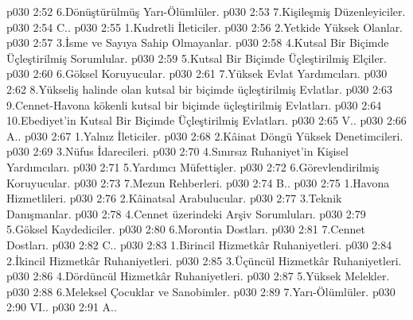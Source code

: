\vs p030 2:52 6.\bibnobreakspace Dönüştürülmüş Yarı\hyp{}Ölümlüler.
\vs p030 2:53 7.\bibnobreakspace Kişileşmiş Düzenleyiciler.
\vs p030 2:54 C.\bibnobreakspace {}.
\vs p030 2:55 1.\bibnobreakspace Kudretli İleticiler.
\vs p030 2:56 2.\bibnobreakspace Yetkide Yüksek Olanlar.
\vs p030 2:57 3.\bibnobreakspace İsme ve Sayıya Sahip Olmayanlar.
\vs p030 2:58 4.\bibnobreakspace Kutsal Bir Biçimde Üçleştirilmiş Sorumlular.
\vs p030 2:59 5.\bibnobreakspace Kutsal Bir Biçimde Üçleştirilmiş Elçiler.
\vs p030 2:60 6.\bibnobreakspace Göksel Koruyucular.
\vs p030 2:61 7.\bibnobreakspace Yüksek Evlat Yardımcıları.
\vs p030 2:62 8.\bibnobreakspace Yükseliş halinde olan kutsal bir biçimde üçleştirilmiş Evlatlar.
\vs p030 2:63 9.\bibnobreakspace Cennet\hyp{}Havona kökenli kutsal bir biçimde üçleştirilmiş Evlatları.
\vs p030 2:64 10.\bibnobreakspace Ebediyet’in Kutsal Bir Biçimde Üçleştirilmiş Evlatları.
\vs p030 2:65 V.\bibnobreakspace {}.
\vs p030 2:66 A.\bibnobreakspace {}.
\vs p030 2:67 1.\bibnobreakspace Yalnız İleticiler.
\vs p030 2:68 2.\bibnobreakspace Kâinat Döngü Yüksek Denetimcileri.
\vs p030 2:69 3.\bibnobreakspace Nüfus İdarecileri.
\vs p030 2:70 4.\bibnobreakspace Sınırsız Ruhaniyet’in Kişisel Yardımcıları.
\vs p030 2:71 5.\bibnobreakspace Yardımcı Müfettişler.
\vs p030 2:72 6.\bibnobreakspace Görevlendirilmiş Koruyucular.
\vs p030 2:73 7.\bibnobreakspace Mezun Rehberleri.
\vs p030 2:74 B.\bibnobreakspace {}.
\vs p030 2:75 1.\bibnobreakspace Havona Hizmetlileri.
\vs p030 2:76 2.\bibnobreakspace Kâinatsal Arabulucular.
\vs p030 2:77 3.\bibnobreakspace Teknik Danışmanlar.
\vs p030 2:78 4.\bibnobreakspace Cennet üzerindeki Arşiv Sorumluları.
\vs p030 2:79 5.\bibnobreakspace Göksel Kaydediciler.
\vs p030 2:80 6.\bibnobreakspace Morontia Dostları.
\vs p030 2:81 7.\bibnobreakspace Cennet Dostları.
\vs p030 2:82 C.\bibnobreakspace {}.
\vs p030 2:83 1.\bibnobreakspace Birincil Hizmetkâr Ruhaniyetleri.
\vs p030 2:84 2.\bibnobreakspace İkincil Hizmetkâr Ruhaniyetleri.
\vs p030 2:85 3.\bibnobreakspace Üçüncül Hizmetkâr Ruhaniyetleri.
\vs p030 2:86 4.\bibnobreakspace Dördüncül Hizmetkâr Ruhaniyetleri.
\vs p030 2:87 5.\bibnobreakspace Yüksek Melekler.
\vs p030 2:88 6.\bibnobreakspace Meleksel Çocuklar ve Sanobimler.
\vs p030 2:89 7.\bibnobreakspace Yarı\hyp{}Ölümlüler.
\vs p030 2:90 VI.\bibnobreakspace {}.
\vs p030 2:91 A..
